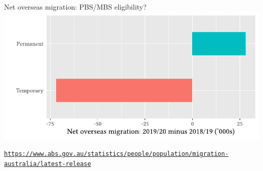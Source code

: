 \documentclass[aspectratio=169,12pt]{beamer} %
\begin{document}
\begin{frame}{Net overseas migration: PBS/MBS eligibility?}
	\center\includegraphics[height=0.75\textheight]{ref/pops-nom.pdf}
	\begin{flushright}\tiny\texttt{\url{https://www.abs.gov.au/statistics/people/population/migration-australia/latest-release}}\end{flushright}
\end{frame}
\end{document}

